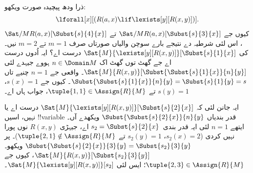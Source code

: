 \documentclass[../../../include/open-logic-section]{subfiles}
\begin{document}
\begin{ex}

ذرا ودھ پیچیدہ صورت ویکھو:
\[
\lforall[x][(R(a,x) \lif \lexists[y][R(x,y)])].
\]
کیوں جے $\Sat/{M}{R(a,x)}[\Subst{s}{3}{x}]$ تے
$\Sat/{M}{R(a,x)}[\Subst{s}{4}{x}]$، اس لئی شرطیہ دے نتیجے
بارے سوچن والیاں صورتاں صرف $m = 1$ تے
$m = 2$ نیں۔ کی $\Sat{M}{\lexists[y][R(x,y)]}[\Subst{s}{1}{x}]$
درست اے؟ ایہ اُدوں درست اے جے گھٹ توں گھٹ اک $n \in \Domain M$
ہووے جیہدے لئی
$\Sat{M}{R(x,y)}[\Subst{\Subst{s}{1}{x}}{n}{y}]$۔ واقعی جے
$n = 1$ چنیے تاں $\Subst{\Subst{s}{1}{x}}{n}{y} = \Subst{s}{1}{y} =
s$۔ کیوں جے $s(x) = 1$، $s(y) = 1$ تے
$\tuple{1,1} \in \Assign{R}{M}$، جواب ہاں اے۔

ایہ جانن لئی کہ $\Sat{M}{\lexists[y][R(x,y)]}[\Subst{s}{2}{x}]$
درست اے یا نہیں، اسیں !!{variable} قدر بندیاں
$\Subst{\Subst{s}{2}{x}}{n}{y}$ ویکھدے آں۔ ایتھے $n = 1$ لئی
ایہ قدر بندی~$s_2 = \Subst{s}{2}{x}$ اے، جیہڑی $R(x,y)$ نوں
پورا نہیں کردی ($s_2(x) =
2$، $s_2(y) = 1$ تے $\tuple{2,1}\notin \Assign{R}{M}$)۔ پر
$\Subst{\Subst{s}{2}{x}}{3}{y} = \Subst{s_2}{3}{y}$ ویکھو۔
$\Sat{M}{R(x,y)}[\Subst{s_2}{3}{y}]$، کیوں جے
$\tuple{2,3} \in
\Assign{R}{M}$؛ ایس لئی $\Sat{M}{\lexists[y][R(x,y)]}[s_2]$۔


\end{ex}
\end{document}
